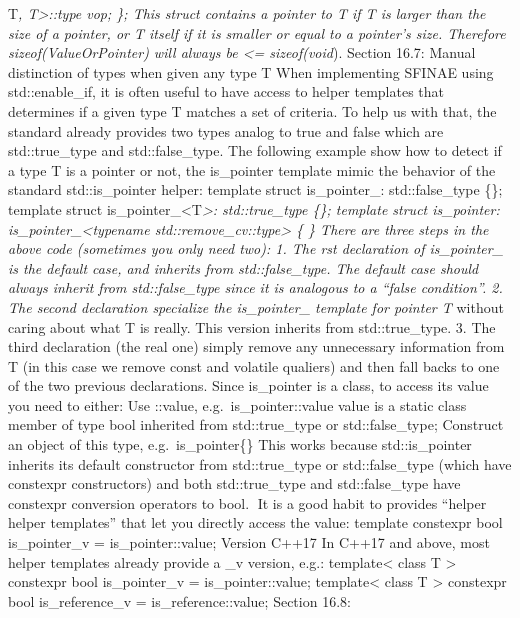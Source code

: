 T\emph{, T\textgreater::type vop; \}; This struct contains a pointer to
T if T is larger than the size of a pointer, or T itself if it is
smaller or equal to a pointer's size. Therefore sizeof(ValueOrPointer)
will always be \textless= sizeof(void}). Section 16.7: Manual
distinction of types when given any type T When implementing SFINAE
using std::enable\_if, it is often useful to have access to helper
templates that determines if a given type T matches a set of criteria.
To help us with that, the standard already provides two types analog to
true and false which are std::true\_type and std::false\_type. The
following example show how to detect if a type T is a pointer or not,
the is\_pointer template mimic the behavior of the standard
std::is\_pointer helper: template struct is\_pointer\_: std::false\_type
\{\}; template struct is\_pointer\_\textless T\emph{\textgreater:
std::true\_type \{\}; template struct is\_pointer:
is\_pointer\_\textless typename std::remove\_cv::type\textgreater{} \{
\} There are three steps in the above code (sometimes you only need
two): 1. The rst declaration of is\_pointer\_ is the default case, and
inherits from std::false\_type. The default case should always inherit
from std::false\_type since it is analogous to a ``false condition''. 2.
The second declaration specialize the is\_pointer\_ template for pointer
T} without caring about what T is really. This version inherits from
std::true\_type. 3. The third declaration (the real one) simply remove
any unnecessary information from T (in this case we remove const and
volatile qualiers) and then fall backs to one of the two previous
declarations. Since is\_pointer is a class, to access its value you need
to either: Use ::value, e.g.~is\_pointer::value value is a static class
member of type bool inherited from std::true\_type or std::false\_type;
Construct an object of this type, e.g.~is\_pointer\{\} This works
because std::is\_pointer inherits its default constructor from
std::true\_type or std::false\_type (which have constexpr constructors)
and both std::true\_type and std::false\_type have constexpr conversion
operators to bool. It is a good habit to provides ``helper helper
templates'' that let you directly access the value: template constexpr
bool is\_pointer\_v = is\_pointer::value; Version C++17 In C++17 and
above, most helper templates already provide a \_v version, e.g.:
template\textless{} class T \textgreater{} constexpr bool is\_pointer\_v
= is\_pointer::value; template\textless{} class T \textgreater{}
constexpr bool is\_reference\_v = is\_reference::value; Section 16.8:
